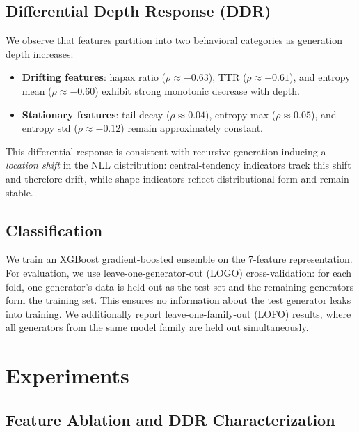 \documentclass[11pt,a4paper]{article}
\newcommand{\rhosp}{\rho}
\begin{document}
\subsection{Differential Depth Response (DDR)}
\label{sec:ddr}
We observe that features partition into two behavioral categories as generation depth increases:
\begin{itemize}[leftmargin=*,nosep]
\item \textbf{Drifting features}: hapax ratio ($\rhosp \approx -0.63$), TTR ($\rhosp \approx -0.61$), and entropy mean ($\rhosp \approx -0.60$) exhibit strong monotonic decrease with depth.
\item \textbf{Stationary features}: tail decay ($\rhosp \approx 0.04$), entropy max ($\rhosp \approx 0.05$), and entropy std ($\rhosp \approx -0.12$) remain approximately constant.
\end{itemize}
This differential response is consistent with recursive generation inducing a \emph{location shift} in the NLL distribution:
central-tendency indicators track this shift and therefore drift,
while shape indicators reflect distributional form and remain stable.

\subsection{Classification}
\label{sec:classification}
We train an XGBoost gradient-boosted ensemble on the 7-feature representation.
For evaluation, we use leave-one-generator-out (LOGO) cross-validation:
for each fold, one generator's data is held out as the test set and the remaining generators form the training set.
This ensures no information about the test generator leaks into training.
We additionally report leave-one-family-out (LOFO) results,
where all generators from the same model family are held out simultaneously.

\section{Experiments}
\label{sec:experiments}

\subsection{Feature Ablation and DDR Characterization}
\label{sec:ablation}
\end{document}

